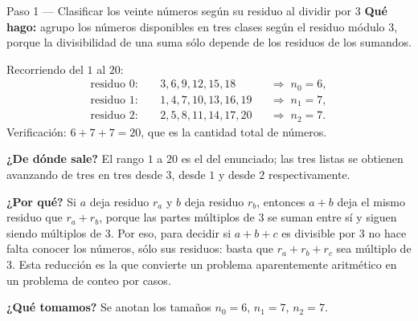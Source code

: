 \documentclass[11pt]{article}
\begin{document}
\begin{paso}{Paso 1 --- Clasificar los veinte números según su residuo al dividir por 3}
\textbf{Qué hago:} agrupo los números disponibles en tres clases según el residuo módulo $3$, porque la divisibilidad de una suma sólo depende de los residuos de los sumandos.

Recorriendo del $1$ al $20$:
\begin{align*}
  \text{residuo }0:&\quad 3,6,9,12,15,18 &&\Rightarrow\; n_0=6,\\
  \text{residuo }1:&\quad 1,4,7,10,13,16,19 &&\Rightarrow\; n_1=7,\\
  \text{residuo }2:&\quad 2,5,8,11,14,17,20 &&\Rightarrow\; n_2=7 .
\end{align*}
Verificación: $6+7+7=20$, que es la cantidad total de números.

\textbf{¿De dónde sale?} El rango $1$ a $20$ es el del enunciado; las tres listas se obtienen avanzando de tres en tres desde $3$, desde $1$ y desde $2$ respectivamente.

\textbf{¿Por qué?} Si $a$ deja residuo $r_a$ y $b$ deja residuo $r_b$, entonces $a+b$ deja el mismo residuo que $r_a+r_b$, porque las partes múltiplos de $3$ se suman entre sí y siguen siendo múltiplos de $3$. Por eso, para decidir si $a+b+c$ es divisible por $3$ no hace falta conocer los números, sólo sus residuos: basta que $r_a+r_b+r_c$ sea múltiplo de $3$. Esta reducción es la que convierte un problema aparentemente aritmético en un problema de conteo por casos.

\textbf{¿Qué tomamos?} Se anotan los tamaños $n_0=6$, $n_1=7$, $n_2=7$.
\end{paso}
\end{document}
